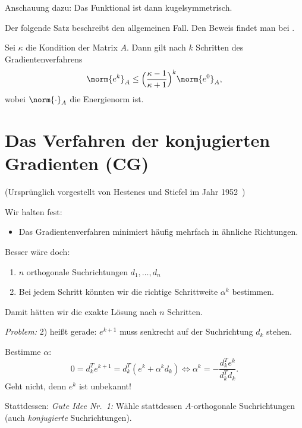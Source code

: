 Anschauung dazu: Das Funktional ist dann kugelsymmetrisch.

\bigskip

Der folgende Satz beschreibt den allgemeinen Fall.  Den Beweis findet man bei \citet{shewchuk:1994}.

\begin{satz}
Sei $\kappa$ die Kondition der Matrix $A$. Dann gilt nach $k$ Schritten des Gradientenverfahrens
\begin{equation*}
 \norm{e^k}_A \leq \Big(\frac{\kappa-1}{\kappa+1}\Big)^k \norm{e^0}_A,
\end{equation*}
wobei $\norm{\cdot}_A$ die Energienorm ist.
\end{satz}

\section{Das Verfahren der konjugierten Gradienten (CG)}

(Ursprünglich vorgestellt von Hestenes und Stiefel im Jahr 1952~\cite{hestenes_stiefel:1952})

Wir halten fest:
\begin{itemize}
 \item Das Gradientenverfahren minimiert häufig mehrfach in ähnliche Richtungen.
\end{itemize}

Besser wäre doch:
\begin{enumerate}
 \item $n$ orthogonale Suchrichtungen $d_1,\ldots,d_n$
 \item Bei jedem Schritt könnten wir die richtige Schrittweite $\alpha^k$ bestimmen.
\end{enumerate}
Damit hätten wir die exakte Lösung nach $n$ Schritten.

\bigskip

\emph{Problem:} 2) heißt gerade: $e^{k+1}$ muss senkrecht auf der Suchrichtung $d_k$ stehen.

Bestimme $\alpha$:
\begin{equation*}
 0 = d_k^Te^{k+1} = d_k^T (e^k+\alpha^kd_k ) \iff \alpha^k=-\frac{d_k^Te^k}{d_k^Td_k}.
\end{equation*}
Geht nicht, denn $e^k$ ist unbekannt!

\medskip

Stattdessen: \emph{Gute Idee Nr.~1:} Wähle stattdessen $A$-orthogonale Suchrichtungen
(auch \emph{konjugierte} Suchrichtungen).

